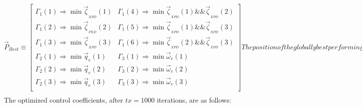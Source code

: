 \begin{subequations}
\begin{equation}
\vec{P}_{Best}\equiv
\begin{bmatrix}
\Gamma_1(1)\Rightarrow \min \vec{\zeta}_{_{XPD}}(1) & \Gamma_1(4)\Rightarrow\min\vec{\zeta}_{_{XPD}}(1)\&\& \vec{\zeta}_{_{XPD}}(2)\\
\Gamma_1(2)\Rightarrow \min \vec{\zeta}_{_{PXD}}(2) & \Gamma_1(5)\Rightarrow\min\vec{\zeta}_{_{XPD}}(1)\&\& \vec{\zeta}_{_{XPD}}(3)\\
\Gamma_1(3)\Rightarrow \min \vec{\zeta}_{_{XPD}}(3) & \Gamma_1(6)\Rightarrow\min\vec{\zeta}_{_{XPD}}(2)\&\& \vec{\zeta}_{_{XPD}}(3)\\
\Gamma_2(1)\Rightarrow \min \vec{q}_e(1) & \Gamma_3(1)\Rightarrow\min\vec{\omega}_e(1)\\
\Gamma_2(2)\Rightarrow \min \vec{q}_e(2) & \Gamma_3(2)\Rightarrow\min\vec{\omega}_e(2)\\
\Gamma_2(3)\Rightarrow \min \vec{q}_e(3) & \Gamma_3(3)\Rightarrow\min\vec{\omega}_e(3)\\
\end{bmatrix}
\end{equation}
The position of the globally best performing swarm is found similarly:
\begin{equation}
\vec{G}_{Best}\equiv
\begin{bmatrix}
\Gamma_1(1)\Rightarrow \min \vec{\zeta}_{_{XPD}}(1) & \Gamma_1(4)\Rightarrow\min\vec{\zeta}_{_{XPD}}(1)\&\& \vec{\zeta}_{_{XPD}}(2)\\
\Gamma_1(2)\Rightarrow \min \vec{\zeta}_{_{PXD}}(2) & \Gamma_1(5)\Rightarrow\min\vec{\zeta}_{_{XPD}}(1)\&\& \vec{\zeta}_{_{XPD}}(3)\\
\Gamma_1(3)\Rightarrow \min \vec{\zeta}_{_{XPD}}(3) & \Gamma_1(6)\Rightarrow\min\vec{\zeta}_{_{XPD}}(2)\&\& \vec{\zeta}_{_{XPD}}(3)\\
\Gamma_2(1)\Rightarrow \min \vec{\zeta}_{_{XPD}}(1) & \Gamma_3(1)\Rightarrow\min\vec{\zeta}_{_{XPD}}(1)\\
\Gamma_2(2)\Rightarrow \min \vec{\zeta}_{_{XPD}}(2) & \Gamma_3(2)\Rightarrow\min\vec{\zeta}_{_{XPD}}(2)\\
\Gamma_2(3)\Rightarrow \min \vec{\zeta}_{_{XPD}}(3) & \Gamma_3(3)\Rightarrow\min\vec{\zeta}_{_{XPD}}(3)\\
\end{bmatrix}
\end{equation}
\end{subequations} 
The optimized control coefficients, after $tx=1000$ iterations, are as follows:
